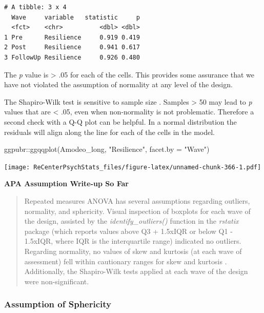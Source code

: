 \documentclass[
  11pt,
]{book}
\newenvironment{Shaded}{\begin{snugshade}}{\end{snugshade}}
\newcommand{\AttributeTok}[1]{\textcolor[rgb]{0.77,0.63,0.00}{#1}}
\newcommand{\FunctionTok}[1]{\textcolor[rgb]{0.00,0.00,0.00}{#1}}
\newcommand{\NormalTok}[1]{#1}
\newcommand{\SpecialCharTok}[1]{\textcolor[rgb]{0.00,0.00,0.00}{#1}}
\newcommand{\StringTok}[1]{\textcolor[rgb]{0.31,0.60,0.02}{#1}}
\begin{document}
\begin{verbatim}
# A tibble: 3 x 4
  Wave     variable   statistic     p
  <fct>    <chr>          <dbl> <dbl>
1 Pre      Resilience     0.919 0.419
2 Post     Resilience     0.941 0.617
3 FollowUp Resilience     0.926 0.480
\end{verbatim}

The \emph{p} value is \textgreater{} .05 for each of the cells. This provides some assurance that we have not violated the assumption of normality at any level of the design.

The Shapiro-Wilk test is sensitive to sample size \citep{datanovia_repeated_nodate}. Samples \textgreater{} 50 may lead to \emph{p} values that are \textless{} .05, even when non-normality is not problematic. Therefore a second check with a Q-Q plot can be helpful. In a normal distribution the residuals will align along the line for each of the cells in the model.

\begin{Shaded}
\begin{Highlighting}[]
\NormalTok{ggpubr}\SpecialCharTok{::}\FunctionTok{ggqqplot}\NormalTok{(Amodeo\_long, }\StringTok{"Resilience"}\NormalTok{, }\AttributeTok{facet.by =} \StringTok{"Wave"}\NormalTok{)}
\end{Highlighting}
\end{Shaded}

\texttt{[image: ReCenterPsychStats\_files/figure-latex/unnamed-chunk-366-1.pdf]}

\textbf{APA Assumption Write-up So Far}

\begin{quote}
Repeated measures ANOVA has several assumptions regarding outliers, normality, and sphericity. Visual inspection of boxplots for each wave of the design, assisted by the \emph{identify\_outliers()} function in the \emph{rstatix} package (which reports values above Q3 + 1.5xIQR or below Q1 - 1.5xIQR, where IQR is the interquartile range) indicated no outliers. Regarding normality, no values of skew and kurtosis (at each wave of assessment) fell within cautionary ranges for skew and kurtosis \citep{kline_principles_2016}. Additionally, the Shapiro-Wilk tests applied at each wave of the design were non-significant.
\end{quote}

\hypertarget{assumption-of-sphericity}{%
\subsubsection{Assumption of Sphericity}\label{assumption-of-sphericity}}
\end{document}
